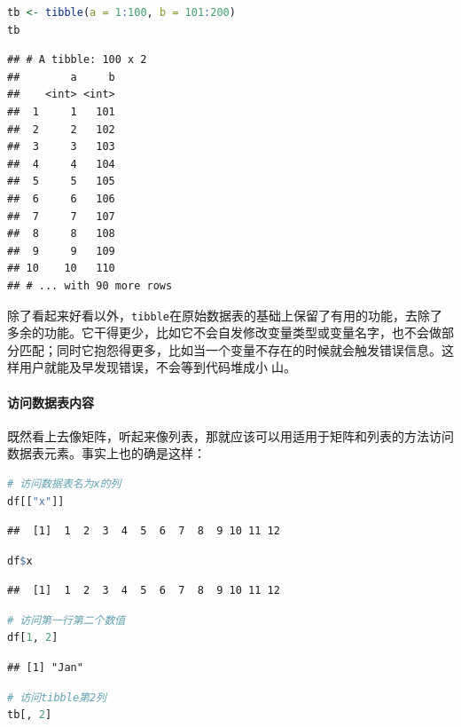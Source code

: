 \documentclass[]{ctexbook}
\let\oldparagraph\paragraph
\renewcommand{\paragraph}[1]{\oldparagraph{#1}\mbox{}}
\newcommand{\passthrough}[1]{#1}
\begin{document}
\begin{lstlisting}[language=R]
tb <- tibble(a = 1:100, b = 101:200)
tb
\end{lstlisting}

\begin{lstlisting}
## # A tibble: 100 x 2
##        a     b
##    <int> <int>
##  1     1   101
##  2     2   102
##  3     3   103
##  4     4   104
##  5     5   105
##  6     6   106
##  7     7   107
##  8     8   108
##  9     9   109
## 10    10   110
## # ... with 90 more rows
\end{lstlisting}

除了看起来好看以外，\passthrough{\lstinline!tibble!}在原始数据表的基础上保留了有用的功能，去除了多余的功能。它干得更少，比如它不会自发修改变量类型或变量名字，也不会做部分匹配；同时它抱怨得更多，比如当一个变量不存在的时候就会触发错误信息。这样用户就能及早发现错误，不会等到代码堆成小💩山。

\hypertarget{ux8bbfux95eeux6570ux636eux8868ux5185ux5bb9}{%
\paragraph{访问数据表内容}\label{ux8bbfux95eeux6570ux636eux8868ux5185ux5bb9}}

既然看上去像矩阵，听起来像列表，那就应该可以用适用于矩阵和列表的方法访问数据表元素。事实上也的确是这样：

\begin{lstlisting}[language=R]
# 访问数据表名为x的列
df[["x"]]
\end{lstlisting}

\begin{lstlisting}
##  [1]  1  2  3  4  5  6  7  8  9 10 11 12
\end{lstlisting}

\begin{lstlisting}[language=R]
df$x
\end{lstlisting}

\begin{lstlisting}
##  [1]  1  2  3  4  5  6  7  8  9 10 11 12
\end{lstlisting}

\begin{lstlisting}[language=R]
# 访问第一行第二个数值
df[1, 2]
\end{lstlisting}

\begin{lstlisting}
## [1] "Jan"
\end{lstlisting}

\begin{lstlisting}[language=R]
# 访问tibble第2列
tb[, 2]
\end{lstlisting}
\end{document}
